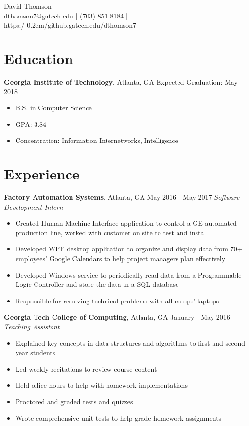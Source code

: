 \documentclass[10pt]{article}
\newcommand{\twobar}{/\kern-0.2em/}
\newcommand{\pipe}{| }
\begin{document}
\begin{center}
\vspace*{0.3em}
{\huge David Thomson} \\
\vspace*{1em}
dthomson7@gatech.edu \pipe (703) 851-8184 \pipe https:\twobar{}github.gatech.edu/dthomson7
\end{center}

\section*{Education}
\textbf{Georgia Institute of Technology}, Atlanta, GA \hfill Expected Graduation: May 2018
\begin{itemize}
    \item B.S. in Computer Science
    \item GPA: 3.84
    \item Concentration: Information Internetworks, Intelligence
\end{itemize}

\section*{Experience}
\textbf{Factory Automation Systems}, Atlanta, GA \hfill May 2016 - May 2017
\linebreak
\textit{Software Development Intern}
\begin{itemize}
    \item Created Human-Machine Interface application to control a GE automated production line, worked with customer on site to test and install
    \item Developed WPF desktop application to organize and display data from 70+ employees' Google Calendars to help project managers plan effectively
    \item Developed Windows service to periodically read data from a Programmable Logic Controller and store the data in a SQL database
    \item Responsible for resolving technical problems with all co-ops' laptops
\end{itemize}

\vspace{3pt}

\textbf{Georgia Tech College of Computing}, Atlanta, GA \hfill January - May 2016
\linebreak
\textit{Teaching Assistant}
\begin{itemize}
    \item Explained key concepts in data structures and algorithms to first and second year students
    \item Led weekly recitations to review course content
    \item Held office hours to help with homework implementations
    \item Proctored and graded tests and quizzes
    \item Wrote comprehensive unit tests to help grade homework assignments
\end{itemize}
\end{document}
